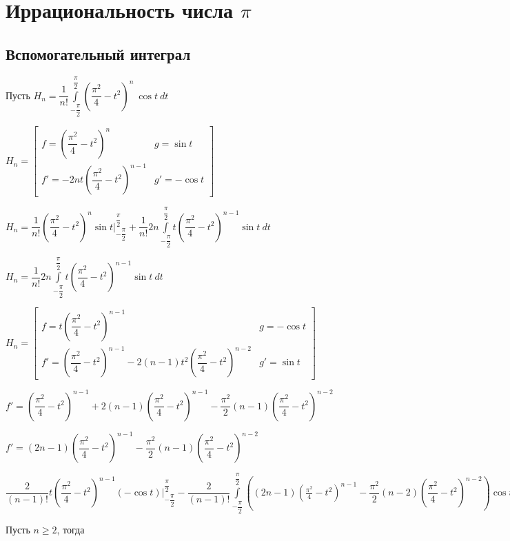 \documentclass{article}
\begin{document}
	\section{Иррациональность числа $\pi$}
	
		\subsection{Вспомогательный интеграл}
		
			Пусть $H_n = \dfrac{1}{n!} \int\limits^{\dfrac{\pi}{2}}_{-\dfrac{\pi}{2}} \left(\dfrac{\pi^2}{4}-t^2\right)^n \ \cos t \ dt$
			
			$H_n = \begin{bmatrix} f = \left(\dfrac{\pi^2}{4} - t^2\right)^n & g = \sin t \\ f' = -2nt \left(\dfrac{\pi^2}{4} - t^2\right)^{n - 1} & g' = -\cos t \end{bmatrix}$
			
			$H_n = \dfrac{1}{n!} \left(\dfrac{\pi^2}{4} - t^2\right)^n \sin t \bigg|^{\dfrac{\pi}{2}}_{-\dfrac{\pi}{2}} + \dfrac{1}{n!} 2n \int\limits^{\dfrac{\pi}{2}}_{-\dfrac{\pi}{2}} t (\dfrac{\pi^2}{4}-t^2)^{n - 1} \sin t \ dt$
			
			$H_n = \dfrac{1}{n!} 2n \int\limits^{\dfrac{\pi}{2}}_{-\dfrac{\pi}{2}} t (\dfrac{\pi^2}{4}-t^2)^{n - 1} \sin t \ dt$
			
			$H_n = \begin{bmatrix} f = t \left(\dfrac{\pi^2}{4} - t^2\right)^{n - 1} & g = -\cos t \\ f' = \left(\dfrac{\pi^2}{4} - t^2\right)^{n - 1} - 2(n - 1)t^2\left(\dfrac{\pi^2}{4} - t^2\right)^{n - 2} & g' = \sin t \end{bmatrix}$
			
			$f' = \left(\dfrac{\pi^2}{4} - t^2\right)^{n - 1} + 2(n - 1)\left(\dfrac{\pi^2}{4} - t^2\right)^{n - 1} - \dfrac{\pi^2}{2} (n - 1) \left(\dfrac{\pi^2}{4} - t^2\right)^{n - 2}$
			
			$f' = (2n - 1)\left(\dfrac{\pi^2}{4} - t^2\right)^{n - 1} - \dfrac{\pi^2}{2}(n - 1)\left(\dfrac{\pi^2}{4}-t^2\right)^{n - 2}$
			
			$\dfrac{2}{(n - 1)!} t \left(\dfrac{\pi^2}{4} - t^2\right)^{n - 1} (-\cos t) \bigg|^{\dfrac{\pi}{2}}_{-\dfrac{\pi}{2}} - \dfrac{2}{(n - 1)!} \int\limits^{\dfrac{\pi}{2}}_{-\dfrac{\pi}{2}} \left( (2n - 1)\left(\frac{\pi^2}{4} - t^2\right)^{n - 1} - \dfrac{\pi^2}{2} (n - 2) \left(\dfrac{\pi^2}{4} - t^2\right)^{n - 2}\right) \cos t \ dt$
			
			Пусть $n \geq 2$, тогда
			
\end{document}
